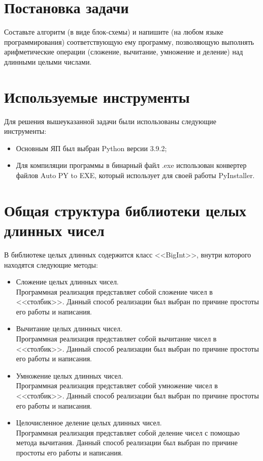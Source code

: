 \section{Постановка задачи}
Составьте алгоритм (в виде блок-схемы) и напишите (на любом языке программирования) соответствующую ему программу,
позволяющую выполнять арифметические операции (сложение, вычитание, умножение и деление) над длинными целыми числами.


\clearpage
\section{Используемые инструменты}
Для решения вышеуказанной задачи были использованы следующие инструменты:
\begin{itemize}
    \item Основным ЯП был выбран Python версии 3.9.2;
    \item Для компиляции программы в бинарный файл .exe использован конвертер файлов Auto PY to EXE,
    который использует для своей работы PyInstaller.
\end{itemize}


\clearpage
\section{Общая структура библиотеки целых\\длинных чисел}
В библиотеке целых длинных содержится класс <<BigInt>>, внутри которого находятся следующие методы:
\begin{itemize}
    \item Сложение целых длинных чисел.\\
    Программная реализация представляет собой сложение чисел в <<столбик>>. Данный способ реализации был выбран по
    причине простоты его работы и написания.
    \item Вычитание целых длинных чисел.\\
    Программная реализация представляет собой вычитание чисел в <<столбик>>. Данный способ реализации был выбран по
    причине простоты его работы и написания.
    \item Умножение целых длинных чисел.\\
    Программная реализация представляет собой умножение чисел в <<столбик>>. Данный способ реализации был выбран по
    причине простоты его работы и написания.
    \item Целочисленное деление целых длинных чисел.\\
    Программная реализация представляет собой деление чисел с помощью метода вычитания. Данный способ
    реализации был выбран по причине простоты его работы и написания.
\end{itemize}

